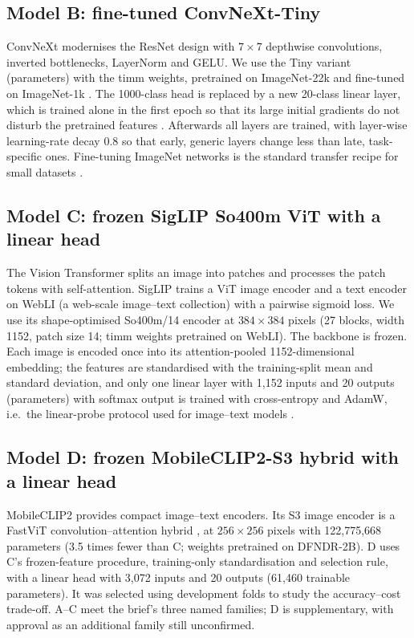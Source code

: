 \documentclass[11pt,a4paper]{article}
\begin{document}
\subsection{Model B: fine-tuned ConvNeXt-Tiny}
ConvNeXt \citep{liu2022convnext} modernises the ResNet design \citep{he2016resnet} with $7\times7$ depthwise
convolutions, inverted bottlenecks, LayerNorm and GELU. We use the Tiny variant (\paramsB parameters) with the
timm weights, pretrained on ImageNet-22k and fine-tuned on
ImageNet-1k \citep{russakovsky2015imagenet}. The 1000-class head is replaced by a new 20-class linear layer, which is
trained alone in the first epoch so that its large initial gradients do not disturb the pretrained features
\citep{kumar2022finetuning}. Afterwards all layers are trained, with layer-wise learning-rate decay 0.8 so that early,
generic layers change less than late, task-specific ones. Fine-tuning ImageNet networks is the standard transfer
recipe for small datasets \citep{yosinski2014transferable, kornblith2019transfer}.

\subsection{Model C: frozen SigLIP So400m ViT with a linear head}\label{sec:modelC}
The Vision Transformer \citep{dosovitskiy2020vit} splits an image into patches and processes the patch tokens with
self-attention. SigLIP \citep{zhai2023siglip} trains a ViT image encoder and a text encoder on WebLI (a web-scale
image--text collection) with a pairwise sigmoid loss. We use its shape-optimised So400m/14 encoder at $384\times384$ pixels (27 blocks,
width 1152, patch size 14; timm weights pretrained on WebLI). The backbone
is frozen. Each image is encoded once into its attention-pooled 1152-dimensional embedding; the features are
standardised with the training-split mean and standard deviation, and only one linear layer with 1,152 inputs and 20 outputs
(\paramsHead parameters) with softmax output is trained with cross-entropy and AdamW, i.e.\ the linear-probe
protocol used for image--text models \citep{radford2021clip}.

\subsection{Model D: frozen MobileCLIP2-S3 hybrid with a linear head}\label{sec:modelD}
MobileCLIP2 \citep{faghri2025mobileclip2} provides compact image--text encoders. Its S3 image encoder is a
FastViT convolution--attention hybrid \citep{vasu2023fastvit}, at $256\times256$ pixels with 122,775,668 parameters
(3.5 times fewer than C; weights pretrained on DFNDR-2B). D uses C's frozen-feature procedure,
training-only standardisation and selection rule, with a linear head with 3,072 inputs and 20 outputs (61,460 trainable parameters).
It was selected using development folds to study the accuracy--cost trade-off.
A--C meet the brief's three named families; D is supplementary, with approval as an additional family still unconfirmed.
\end{document}
